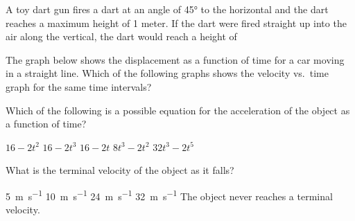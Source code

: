 \documentclass{../../../oss-apphys-exam}
\begin{document}
\begin{multicols*}{2}
\begin{questions}
    \question A toy dart gun fires a dart at an angle of \ang{45} to the
    horizontal and the dart reaches a maximum height of 1 meter. If the dart
    were fired straight up into the air along the vertical, the dart would
    reach a height of
    \columnbreak
    
    \question The graph below shows the displacement as a function of time for a
    car moving in a straight line. Which of the following graphs shows the
    velocity vs.\ time graph for the same time intervals?
    \\
    \columnbreak
    

    \question Which of the following is a possible equation for the
    acceleration of the object as a function of time?
    \begin{choices}
      \choice $16-2t^2$
      \choice $16-2t^3$
      \choice $16-2t$
      \choice $8t^3-2t^2$
      \choice $32t^3-2t^5$
    \end{choices}
    \label{q:fall1}
    
    \question What is the terminal velocity of the object as it falls?
    \begin{choices}
      \choice \SI{5}{\metre\per\second}
      \choice \SI{10}{\metre\per\second}
      \choice \SI{24}{\metre\per\second}
      \choice \SI{32}{\metre\per\second}
      \choice The object never reaches a terminal velocity.
    \end{choices}
    \label{q:fall2}
  \end{questions}
\end{multicols*}
\newpage


\genfreedirections
\end{document}
